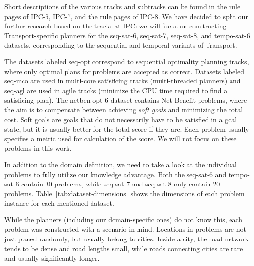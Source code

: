 Short descriptions of the various tracks and subtracks can be found in the rule pages of IPC-6,
IPC-7,
and the rule pages of IPC-8.
We have decided to split our further research based on the tracks at IPC: we will focus on constructing
Transport-specific planners for the seq-sat-6, seq-sat-7, seq-sat-8, and tempo-sat-6 datasets,
corresponding to the sequential and temporal variants of Transport.

The datasets labeled seq-opt correspond to sequential optimality planning tracks,
where only optimal plans for problems are accepted as correct.
Datasets labeled seq-mco are used in multi-core satisficing tracks (multi-threaded planners)
and seq-agl are used in agile tracks (minimize the CPU time required to find a satisficing plan).
The netben-opt-6 dataset contains Net Benefit problems, where the aim
is to compensate between achieving \textit{soft goals} and minimizing the total cost.
Soft goals are goals that do not necessarily have to be satisfied in a goal state,
but it is usually better for the total score if they are.
Each problem usually specifies a metric used for calculation of the score.
We will not focus on 
these problems in this work.

In addition to the domain definition, we need to take a look at the individual problems to fully utilize our knowledge advantage.
Both the seq-sat-6 and tempo-sat-6 contain 30 problems, while seq-sat-7 and seq-sat-8 only contain 20 problems. Table~\ref{tab:dataset-dimensions} shows the
dimensions of each problem instance for each mentioned dataset.

While the planners (including our domain-specific ones) do not know this,
each problem was constructed with a scenario in mind. Locations in problems are not just
placed randomly, but usually belong to cities. Inside a city, the road network
tends to be dense and road lengths small, while roads connecting cities
are rare and usually significantly longer.


